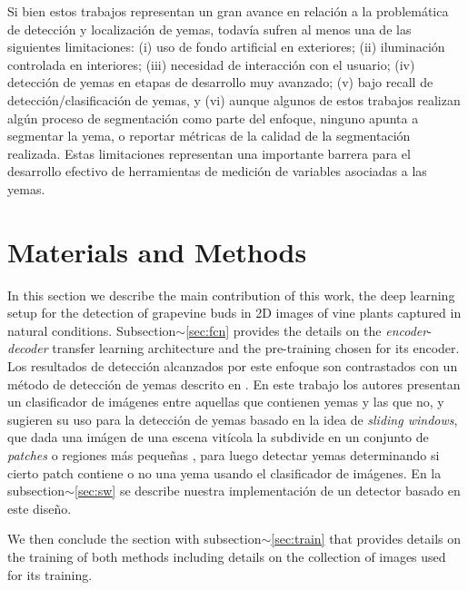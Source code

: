 \documentclass[a4paper,authoryear,review]{elsarticle}
\begin{document}
	Si bien estos trabajos representan un gran avance en relación a la problemática de detección y localización de yemas, todavía sufren al menos una de las siguientes limitaciones: (i) uso de fondo artificial en exteriores; (ii) iluminación controlada en interiores; (iii) necesidad de interacción con el usuario; (iv) detección de yemas en etapas de desarrollo muy avanzado; (v) bajo recall de detección/clasificación de yemas, y (vi) aunque algunos de estos trabajos realizan algún proceso de segmentación como parte del enfoque, ninguno apunta a segmentar la yema, o reportar métricas de la calidad de la segmentación realizada. Estas limitaciones representan una importante barrera para el desarrollo efectivo de herramientas de medición de variables asociadas a las yemas. 
	
	\section{Materials and Methods}
	\label{sec:matmet}
	
	In this section we describe the main contribution of this work, the  deep learning setup for the detection of grapevine buds in 2D images of vine plants captured in natural conditions. 
	Subsection$\sim$\ref{sec:fcn} provides the details on the \emph{encoder}-\emph{decoder} transfer learning architecture and the pre-training chosen for its encoder. 
	Los resultados de detección alcanzados por este enfoque son contrastados con un método de detección de yemas descrito en \citet{perez2017image}. En este trabajo los autores presentan un clasificador de imágenes entre aquellas que contienen yemas y las que no, y sugieren su uso para la detección de yemas basado en la idea de  \emph{sliding windows}, que dada una imágen de una escena vitícola la subdivide en un conjunto de \emph{patches} o regiones más pequeñas \citep{perez2017image}, para luego detectar yemas determinando si cierto patch contiene o no una yema usando el clasificador de imágenes. En la subsection$\sim$\ref{sec:sw} se describe nuestra implementación de un detector basado en este diseño.
	
	We then conclude the section with subsection$\sim$\ref{sec:train} that provides details on the training of both methods including details on the collection of images used for its training. 
	
	
	
\end{document}

